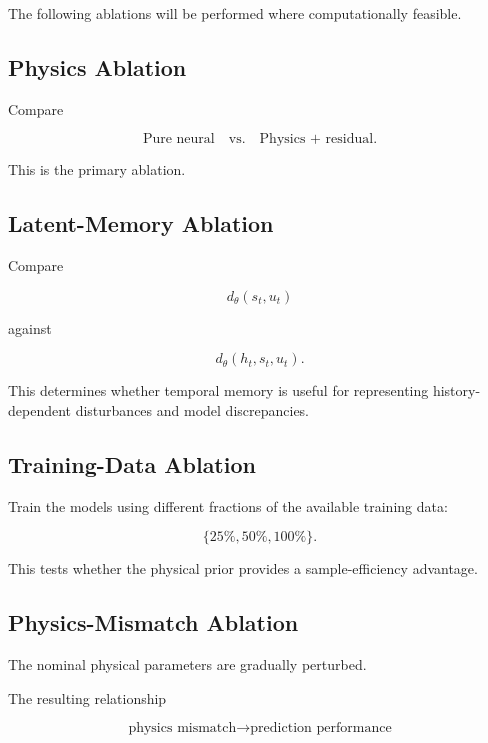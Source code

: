 \documentclass[conference]{IEEEtran}
\begin{document}
The following ablations will be performed where computationally
feasible.

\subsection{Physics Ablation}

Compare

\begin{equation}
\text{Pure neural}
\quad\text{vs.}\quad
\text{Physics + residual}.
\end{equation}

This is the primary ablation.


\subsection{Latent-Memory Ablation}

Compare

\begin{equation}
d_{\theta}(s_t,u_t)
\end{equation}

against

\begin{equation}
d_{\theta}(h_t,s_t,u_t).
\end{equation}

This determines whether temporal memory is useful for representing
history-dependent disturbances and model discrepancies.


\subsection{Training-Data Ablation}

Train the models using different fractions of the available training
data:

\begin{equation}
\{25\%,50\%,100\%\}.
\end{equation}

This tests whether the physical prior provides a sample-efficiency
advantage.


\subsection{Physics-Mismatch Ablation}

The nominal physical parameters are gradually perturbed.

The resulting relationship

\begin{equation}
\text{physics mismatch}
\rightarrow
\text{prediction performance}
\end{equation}
\end{document}
